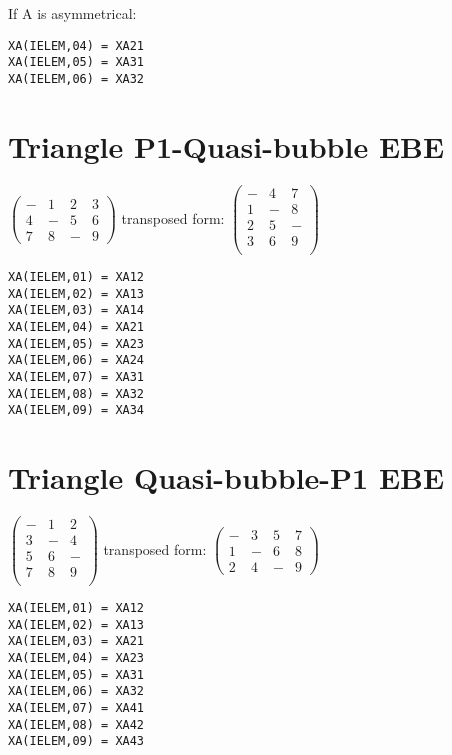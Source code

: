 If A is asymmetrical:

\begin{lstlisting}[language=TelFortran]
XA(IELEM,04) = XA21
XA(IELEM,05) = XA31
XA(IELEM,06) = XA32
\end{lstlisting}

\section{Triangle P1-Quasi-bubble EBE}

$\left(\begin{array}{cccc}
    {-} & {1} & {2} & {3} \\
    {4} & {-} & {5} & {6} \\
    {7} & {8} & {-} & {9}
\end{array}\right)$
transposed form:
$\left(\begin{array}{ccc}
    {-} & {4} & {7} \\
    {1} & {-} & {8} \\
    {2} & {5} & {-} \\
    {3} & {6} & {9} \\
\end{array}\right)$

\begin{lstlisting}[language=TelFortran]
XA(IELEM,01) = XA12
XA(IELEM,02) = XA13
XA(IELEM,03) = XA14
XA(IELEM,04) = XA21
XA(IELEM,05) = XA23
XA(IELEM,06) = XA24
XA(IELEM,07) = XA31
XA(IELEM,08) = XA32
XA(IELEM,09) = XA34
\end{lstlisting}

\section{Triangle Quasi-bubble-P1 EBE}

$\left(\begin{array}{ccc}
    {-} & {1} & {2} \\
    {3} & {-} & {4} \\
    {5} & {6} & {-} \\
    {7} & {8} & {9} \\
\end{array}\right)$
transposed form:
$\left(\begin{array}{cccc}
    {-} & {3} & {5} & {7} \\
    {1} & {-} & {6} & {8} \\
    {2} & {4} & {-} & {9}
\end{array}\right)$

\begin{lstlisting}[language=TelFortran]
XA(IELEM,01) = XA12
XA(IELEM,02) = XA13
XA(IELEM,03) = XA21
XA(IELEM,04) = XA23
XA(IELEM,05) = XA31
XA(IELEM,06) = XA32
XA(IELEM,07) = XA41
XA(IELEM,08) = XA42
XA(IELEM,09) = XA43
\end{lstlisting}

